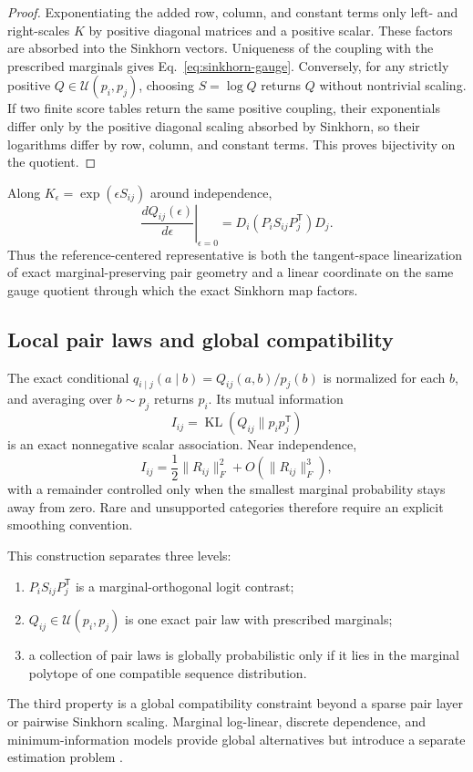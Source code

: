 \documentclass[10pt]{article}
\theoremstyle{definition}
\theoremstyle{remark}
\newcommand{\BookSection}[1]{\subsection{#1}}
\begin{document}
\begin{proof}
Exponentiating the added row, column, and constant terms only left- and right-scales $K$ by
positive diagonal matrices and a positive scalar.  These factors are absorbed into the Sinkhorn
vectors.  Uniqueness of the coupling with the prescribed marginals gives
Eq.~\ref{eq:sinkhorn-gauge}.
Conversely, for any strictly positive $Q\in\mathcal U(p_i,p_j)$, choosing $S=\log Q$ returns $Q$
without nontrivial scaling.  If two finite score tables return the same positive coupling, their
exponentials differ only by the positive diagonal scaling absorbed by Sinkhorn, so their logarithms
differ by row, column, and constant terms.  This proves bijectivity on the quotient.
\end{proof}

Along
$K_\epsilon=\exp(\epsilon S_{ij})$ around independence,
\begin{equation}
\left.\frac{dQ_{ij}(\epsilon)}{d\epsilon}\right|_{\epsilon=0}
=D_i(P_iS_{ij}P_j^{\mathsf T})D_j.
\label{eq:sinkhorn-linearization}
\end{equation}
Thus the reference-centered representative is both the tangent-space linearization of exact
marginal-preserving pair geometry and a linear coordinate on the same gauge quotient through which
the exact Sinkhorn map factors.

\BookSection{Local pair laws and global compatibility}

The exact conditional $q_{i\mid j}(a\mid b)=Q_{ij}(a,b)/p_j(b)$ is normalized for each $b$, and
averaging over $b\sim p_j$ returns $p_i$.  Its mutual information
\begin{equation}
I_{ij}=\operatorname{KL}(Q_{ij}\|p_ip_j^{\mathsf T})
\end{equation}
is an exact nonnegative scalar association.  Near independence,
\begin{equation}
I_{ij}=\frac12\|R_{ij}\|_F^2+O(\|R_{ij}\|_F^3),
\label{eq:mi-local-geometry}
\end{equation}
with a remainder controlled only when the smallest marginal probability stays away from zero.
Rare and unsupported categories therefore require an explicit smoothing convention.

This construction separates three levels:
\begin{enumerate}
\setlength{\itemsep}{1pt}
\item $P_iS_{ij}P_j^{\mathsf T}$ is a marginal-orthogonal logit contrast;
\item $Q_{ij}\in\mathcal U(p_i,p_j)$ is one exact pair law with prescribed marginals;
\item a collection of pair laws is globally probabilistic only if it lies in the marginal polytope
of one compatible sequence distribution.
\end{enumerate}
The third property is a global compatibility constraint beyond a sparse pair layer or pairwise
Sinkhorn scaling.  Marginal log-linear, discrete dependence, and minimum-information models provide global alternatives but
introduce a separate estimation problem \cite{bergsma2002,geenens2020,sei2024}.
\end{document}
